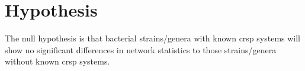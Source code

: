 \section*{\huge Hypothesis}
The null hypothesis is that bacterial strains/genera with known \ac{crsp} systems will show no significant differences in network statistics to those strains/genera without known \ac{crsp} systems.
